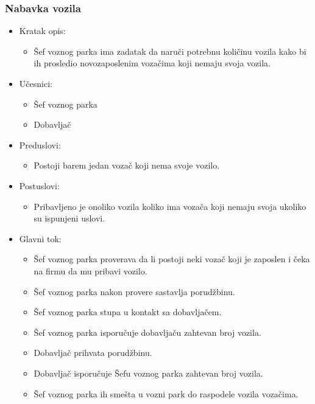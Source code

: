 \subsubsection{\bfseries Nabavka vozila}
\begin{itemize}
	\item Kratak opis:
		\begin{itemize}
			\item Šef voznog parka ima zadatak da naruči potrebnu količinu vozila kako bi ih prosledio novozaposlenim vozačima koji nemaju svoja vozila.
		\end{itemize}

	\item Učesnici:
		\begin{itemize}
		    \item Šef voznog parka
			\item Dobavljač
		\end{itemize}


	\item Preduslovi:
		\begin{itemize}
		    \item Postoji barem jedan vozač koji nema svoje vozilo.
		\end{itemize}


	\item Postuslovi:
		\begin{itemize}
			\item Pribavljeno je onoliko vozila koliko ima vozača koji nemaju svoja ukoliko su ispunjeni uslovi.
	\end{itemize}

	\item Glavni tok:
		\begin{itemize}
		    \item Šef voznog parka proverava da li postoji neki vozač koji je zaposlen i čeka na firmu da mu pribavi vozilo.
		    \item Šef voznog parka nakon provere sastavlja porudžbinu.
		    \item Šef voznog parka stupa u kontakt sa dobavljačem.
			\item Šef voznog parka isporučuje dobavljaču zahtevan broj vozila.
			\item Dobavljač prihvata porudžbinu.
			\item Dobavljač isporučuje Šefu voznog parka zahtevan broj vozila.
			\item Šef voznog parka ih smešta u vozni park do raspodele vozila vozačima.
		\end{itemize}


\end{itemize}
